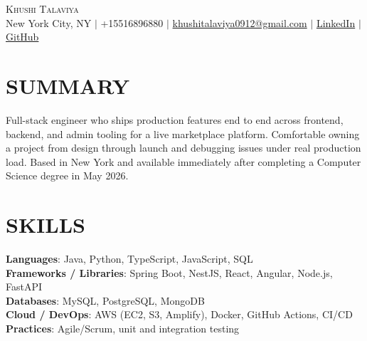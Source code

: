 \documentclass[letterpaper,11pt]{article}
\begin{document}
\begin{center}
    {\Huge \scshape Khushi Talaviya} \\ \vspace{2pt}
    \vspace{4pt}
    \small
    New York City, NY $|$
    \small
    +15516896880 $|$
    \href{mailto:khushitalaviya0912@gmail.com}{khushitalaviya0912@gmail.com} $|$
    \href{https://www.linkedin.com/in/khushitalaviya/}{LinkedIn} $|$
    \href{https://github.com/talaviyakhushi}{GitHub}
\end{center}

\section{SUMMARY}
\vspace{5pt}
\small{Full-stack engineer who ships production features end to end across frontend, backend, and admin tooling for a live marketplace platform. Comfortable owning a project from design through launch and debugging issues under real production load. Based in New York and available immediately after completing a Computer Science degree in May 2026.}

\vspace{2pt}
\section{SKILLS}
\vspace{5pt}
\begin{itemize}[leftmargin=0in, label={}]
\small{\item{
\textbf{Languages}{: Java, Python, TypeScript, JavaScript, SQL} \\
\textbf{Frameworks / Libraries}{: Spring Boot, NestJS, React, Angular, Node.js, FastAPI} \\
\textbf{Databases}{: MySQL, PostgreSQL, MongoDB} \\
\textbf{Cloud / DevOps}{: AWS (EC2, S3, Amplify), Docker, GitHub Actions, CI/CD} \\
\textbf{Practices}{: Agile/Scrum, unit and integration testing}
}}
\end{itemize}
\vspace{-10pt}

\end{document}
